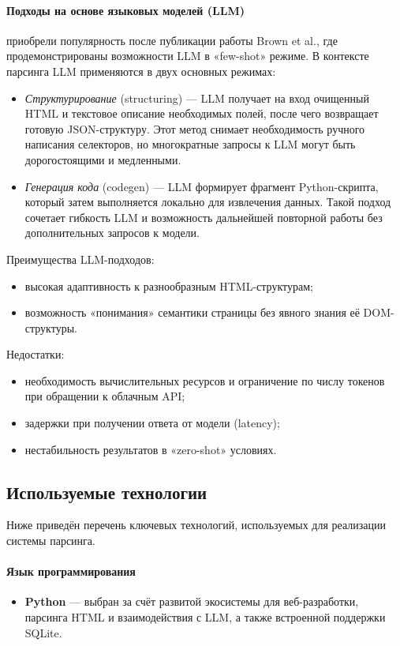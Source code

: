 \paragraph{Подходы на основе языковых моделей (LLM)} приобрели популярность после публикации работы Brown et al.\cite{brown2020language}, где продемонстрированы возможности LLM в «few-shot» режиме. В контексте парсинга LLM применяются в двух основных режимах:
\begin{itemize}
    \item \emph{Структурирование} (structuring) — LLM получает на вход очищенный HTML и текстовое описание необходимых полей, после чего возвращает готовую JSON-структуру. Этот метод снимает необходимость ручного написания селекторов, но многократные запросы к LLM могут быть дорогостоящими и медленными.
    \item \emph{Генерация кода} (codegen) — LLM формирует фрагмент Python-скрипта, который затем выполняется локально для извлечения данных. Такой подход сочетает гибкость LLM и возможность дальнейшей повторной работы без дополнительных запросов к модели.
\end{itemize}
Преимущества LLM-подходов:
\begin{itemize}
    \item высокая адаптивность к разнообразным HTML-структурам;
    \item возможность «понимания» семантики страницы без явного знания её DOM-структуры.
\end{itemize}
Недостатки:
\begin{itemize}
    \item необходимость вычислительных ресурсов и ограничение по числу токенов при обращении к облачным API;
    \item задержки при получении ответа от модели (latency);
    \item нестабильность результатов в «zero-shot» условиях.
\end{itemize}

\subsection{Используемые технологии}

Ниже приведён перечень ключевых технологий, используемых для реализации системы парсинга.

\paragraph{Язык программирования}
\begin{itemize}
    \item \textbf{Python}\cite{python-official} — выбран за счёт развитой экосистемы для веб-разработки, парсинга HTML и взаимодействия с LLM, а также встроенной поддержки SQLite.
\end{itemize}

